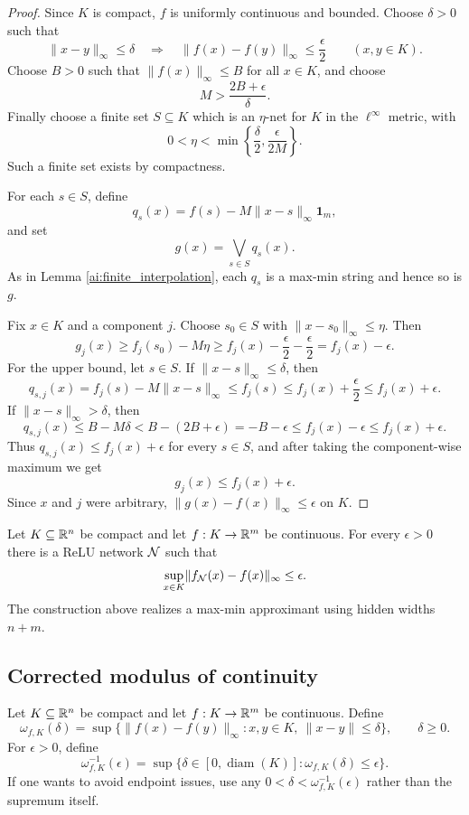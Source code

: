 \begin{proof}
Since $K$ is compact, $f$ is uniformly continuous and bounded.  Choose $\delta>0$ such that
\[
\lVert x-y\rVert_\infty\leq \delta
\quad\Longrightarrow\quad
\lVert f(x)-f(y)\rVert_\infty\leq \frac{\epsilon}{2}
\qquad(x,y\in K).
\]
Choose $B>0$ such that $\lVert f(x)\rVert_\infty\leq B$ for all $x\in K$, and choose
\[
M>\frac{2B+\epsilon}{\delta}.
\]
Finally choose a finite set $S\subseteq K$ which is an $\eta$-net for $K$ in the $\ell^\infty$ metric, with
\[
0<\eta<\min\left\{\frac{\delta}{2},\frac{\epsilon}{2M}\right\}.
\]
Such a finite set exists by compactness.

For each $s\in S$, define
\[
q_s(x)=f(s)-M\lVert x-s\rVert_\infty\mathbf 1_m,
\]
and set
\[
g(x)=\bigvee_{s\in S}q_s(x).
\]
As in Lemma \ref{ai:finite_interpolation}, each $q_s$ is a max-min string and hence so is $g$.

Fix $x\in K$ and a component $j$.  Choose $s_0\in S$ with $\lVert x-s_0\rVert_\infty\leq\eta$.  Then
\[
g_j(x)
\geq f_j(s_0)-M\eta
\geq f_j(x)-\frac{\epsilon}{2}-\frac{\epsilon}{2}
=f_j(x)-\epsilon.
\]
For the upper bound, let $s\in S$.  If $\lVert x-s\rVert_\infty\leq\delta$, then
\[
q_{s,j}(x)=f_j(s)-M\lVert x-s\rVert_\infty\leq f_j(s)
\leq f_j(x)+\frac{\epsilon}{2}
\leq f_j(x)+\epsilon.
\]
If $\lVert x-s\rVert_\infty>\delta$, then
\[
q_{s,j}(x)
\leq B-M\delta
< B-(2B+\epsilon)
=-B-\epsilon
\leq f_j(x)-\epsilon
\leq f_j(x)+\epsilon.
\]
Thus $q_{s,j}(x)\leq f_j(x)+\epsilon$ for every $s\in S$, and after taking the component-wise maximum we get
\[
g_j(x)\leq f_j(x)+\epsilon.
\]
Since $x$ and $j$ were arbitrary, $\lVert g(x)-f(x)\rVert_\infty\leq\epsilon$ on $K$.
\end{proof}

\begin{cor}
\label{ai:relu_approximation}
Let $K\subseteq\mathbb{R}^n$ be compact and let $f:K\to\mathbb{R}^m$ be continuous.  For every $\epsilon>0$ there is a ReLU network $\mathcal{N}$ such that
\[
\sup_{x\in K}\lVert f_{\mathcal{N}}(x)-f(x)\rVert_\infty\leq\epsilon.
\]
The construction above realizes a max-min approximant using hidden widths $n+m$.
\end{cor}

\subsection{Corrected modulus of continuity}

\begin{defn}
Let $K\subseteq\mathbb{R}^n$ be compact and let $f:K\to\mathbb{R}^m$ be continuous.  Define
\[
\omega_{f,K}(\delta)=\sup\{\lVert f(x)-f(y)\rVert_\infty:x,y\in K,\ \lVert x-y\rVert\leq\delta\},
\qquad \delta\geq0.
\]
For $\epsilon>0$, define
\[
\omega_{f,K}^{-1}(\epsilon)
=\sup\{\delta\in[0,\operatorname{diam}(K)]:\omega_{f,K}(\delta)\leq\epsilon\}.
\]
If one wants to avoid endpoint issues, use any $0<\delta<\omega_{f,K}^{-1}(\epsilon)$ rather than the supremum itself.
\end{defn}

